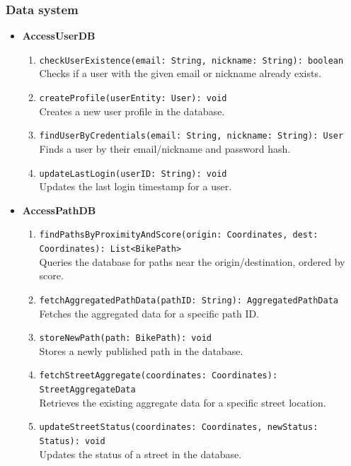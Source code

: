 \subsubsection{Data system}
\begin{itemize}
    \item \textbf{AccessUserDB}
        \begin{enumerate}
            \item \texttt{checkUserExistence(email: String, nickname: String): boolean} \\ Checks if a user with the given email or nickname already exists.
            \item \texttt{createProfile(userEntity: User): void} \\ Creates a new user profile in the database.
            \item \texttt{findUserByCredentials(email: String, nickname: String): User} \\ Finds a user by their email/nickname and password hash.
            \item \texttt{updateLastLogin(userID: String): void} \\ Updates the last login timestamp for a user.
        \end{enumerate}
    \item \textbf{AccessPathDB}
        \begin{enumerate}
            \item \texttt{findPathsByProximityAndScore(origin: Coordinates, dest: Coordinates): List<BikePath>} \\ Queries the database for paths near the origin/destination, ordered by score.
            \item \texttt{fetchAggregatedPathData(pathID: String): AggregatedPathData} \\ Fetches the aggregated data for a specific path ID.
            \item \texttt{storeNewPath(path: BikePath): void} \\ Stores a newly published path in the database.
            \item \texttt{fetchStreetAggregate(coordinates: Coordinates): StreetAggregateData} \\ Retrieves the existing aggregate data for a specific street location.
            \item \texttt{updateStreetStatus(coordinates: Coordinates, newStatus: Status): void} \\ Updates the status of a street in the database.
        \end{enumerate}
\end{itemize}


